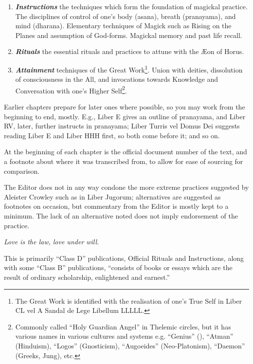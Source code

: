 \begin{enumerate}[label=\greek*]
\item \textbf{\textit{Instructions}} \textemdash{} the techniques which form the foundation of magickal practice. The disciplines of control of one's body (asana), breath (pranayama), and mind (dharana). Elementary techniques of Magick such as Rising on the Planes and assumption of God-forms. Magickal memory and past life recall.
\item \textbf{\textit{Rituals}} \textemdash{} the essential rituals and practices to attune with the \AE{}on of Horus.
\item \textbf{\textit{Attainment}} \textemdash{} techniques of the Great Work\footnote{The Great Work is identified with the realisation of one's True Self in Liber CL vel  A Sandal de Lege Libellum L\textendash{}L\textendash{}L\textendash{}L\textendash{}L.}. Union with deities, dissolution of consciousness in the All, and invocations towards Knowledge and Conversation with one's Higher Self\footnote{Commonly called \enquote{Holy Guardian Angel} in Thelemic circles, but it has various names in various cultures and systems e.g. \enquote{Genius} (\GD{}), \enquote{Atman} (Hinduism), \enquote{Logos} (Gnosticism), \enquote{Augoeides} (Neo-Platonism), \enquote{Daemon} (Greeks, Jung), etc.}.
\end{enumerate}

Earlier chapters prepare for later ones where possible, so you may work from the beginning to end, mostly. E.g., Liber E gives an outline of pranayama, and Liber RV, later, further instructs in pranayama; Liber Turris vel Domus Dei suggests reading Liber E and Liber HHH first, so both come before it; and so on.

At the beginning of each chapter is the official document number of the text, and a footnote about where it was transcribed from, to allow for ease of sourcing for comparison.

The Editor does not in any way condone the more extreme practices suggested by Aleister Crowley such as in Liber Jugorum; alternatives are suggested as footnotes on occasion, but commentary from the Editor is mostly kept to a minimum. The lack of an alternative noted does not imply endorsement of the practice.

\textit{Love is the law, love under will.}



This is primarily \enquote{Class D} publications, Official Rituals and Instructions, along with some \enquote{Class B} publications, \enquote{consists of books or essays which are the result of ordinary scholarship, enlightened and earnest.}

